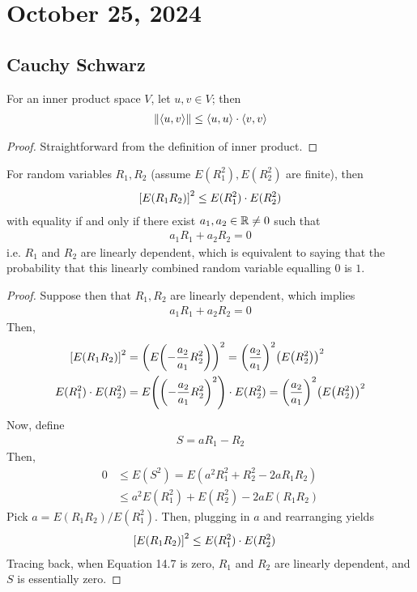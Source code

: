 \section{October 25, 2024}

\subsection{Cauchy Schwarz}
\begin{theorem}
    For an inner product space $V$, let $u,v\in V$; then
    \begin{align}
        \norm{\langle u, v \rangle} \le \langle u, u \rangle \cdot \langle v, v \rangle
    \end{align}
\end{theorem}
\begin{proof}
    Straightforward from the definition of inner product.
\end{proof}

\begin{proposition}
    For random variables $R_1,R_2$ (assume $E(R_1^2),E(R_2^2)$ are finite), then
    \begin{align}
        \qty[ E(R_1R_2) ]^2 \le E(R_1^2) \cdot E(R_2^2)
    \end{align}
    with equality if and only if there exist $a_1,a_2 \in \mathbb{R} \ne 0$ such that
    \begin{align}
        a_1R_1 + a_2R_2 = 0
    \end{align}
    i.e. $R_1$ and $R_2$ are linearly dependent, which is equivalent to saying that the probability that this linearly combined random variable equalling $0$ is $1$.
\end{proposition}
\begin{proof}
    Suppose then that $R_1,R_2$ are linearly dependent, which implies
    \begin{align}
        a_1R_1 + a_2R_2 = 0
    \end{align}
    Then,
    \begin{align}
        \qty[E(R_1R_2)]^2 &= \qty(E\qty(-\frac{a_2}{a_1}R_2^2))^2 = \qty(\frac{a_2}{a_1})^2 \qty(E\qty(R_2^2))^2\\
        E(R_1^2) \cdot E(R_2^2) &= E\qty(\qty(-\frac{a_2}{a_1}R_2^2)^2) \cdot E(R_2^2) = \qty(\frac{a_2}{a_1})^2 \qty(E\qty(R_2^2))^2
    \end{align}
    Now, define
    \begin{align}
        S = aR_1 - R_2
    \end{align}
    Then,
    \begin{align}
        0 &\le E(S^2) = E(a^2R_1^2 + R_2^2 - 2aR_1R_2)\\
        &\le a^2 E(R_1^2) + E(R_2^2) - 2aE(R_1R_2)
    \end{align}
    Pick $a = E(R_1R_2)/E(R_1^2)$. Then, plugging in $a$ and rearranging yields
    \begin{align}
        \qty[E(R_1R_2)]^2 \le E(R_1^2) \cdot E(R_2^2) & \qedhere
    \end{align}
    Tracing back, when Equation 14.7 is zero, $R_1$ and $R_2$ are linearly dependent, and $S$ is essentially zero.
\end{proof}

